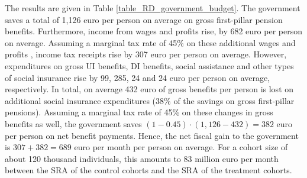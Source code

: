 \documentclass[12pt,a4paper]{article}
\begin{document}
The results are given in Table \ref{table_RD_government_budget}. The government saves a total of 1,126 euro per person on average on gross first-pillar pension benefits. Furthermore, income from wages and profits rise, by 682 euro per person on average. Assuming a marginal tax rate of 45\% on these additional wages and profits \citep{quist_2015}, income tax receipts rise by 307 euro per person on average. However, expenditures on gross UI benefits, DI benefits, social assistance and other types of social insurance rise by 99, 285, 24 and 24 euro per person on average, respectively. In total, on average 432 euro of gross benefits per person is lost on additional social insurance expenditures (38\% of the savings on gross first-pillar pensions). Assuming a marginal tax rate of 45\% on these changes in gross benefits as well, the government saves $(1-0.45)\cdot(1,126-432)=382$ euro per person on net benefit payments. Hence, the net fiscal gain to the government is $307+382=689$ euro per month per person on average. For a cohort size of about 120 thousand individuals, this amounts to 83 million euro per month between the SRA of the control cohorts and the SRA of the treatment cohorts.     


 
\end{document}
